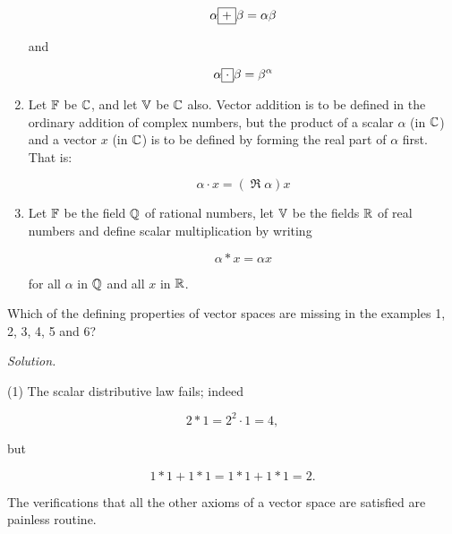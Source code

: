 \begin{enumerate}
          \begin{equation}
              \alpha \boxed{ + } \beta = \alpha\beta
          \end{equation}

          and

          \begin{equation}
              \alpha \boxed{\cdot} \beta = \beta^\alpha
          \end{equation}

    \item Let $\mathbb{F}$ be $\mathbb{C}$, and let $\mathbb{V}$ be $\mathbb{C}$ also. Vector addition is to be defined in the ordinary addition of complex numbers, but the product of a scalar $\alpha$ (in $\mathbb{C}$) and a vector $x$ (in $\mathbb{C}$) is to be defined by forming the real part of $\alpha$ first. That is:

          \begin{equation}
              \alpha \cdot x = (\operatorname{\Re} \alpha)x
          \end{equation}

    \item Let $\mathbb{F}$ be the field $\mathbb{Q}$ of rational numbers, let $\mathbb{V}$ be the fields $\mathbb{R}$ of real numbers and define scalar multiplication by writing

          \begin{equation}
              \alpha \ast x = \alpha x
          \end{equation}

          for all $\alpha$ in $\mathbb{Q}$ and all $x$ in $\mathbb{R}$.
\end{enumerate}

\begin{problem}
Which of the defining properties of vector spaces are missing in the examples 1, 2, 3, 4, 5 and 6?
\end{problem}

\textit{Solution. }

(1) The scalar distributive law fails; indeed

\begin{equation}
    2 \ast 1 = 2^2 \cdot 1 = 4,
\end{equation}

but

\begin{equation}
    1 \ast 1 + 1 \ast 1 = 1 \ast 1 + 1 \ast 1 = 2.
\end{equation}

The verifications that all the other axioms of a vector space are satisfied are painless routine.

